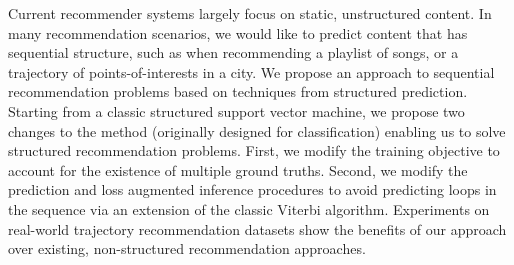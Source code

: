 
Current recommender systems largely focus on static, unstructured content.
In many recommendation scenarios, we would like to predict content that has sequential structure,
such as when recommending a playlist of songs, or a trajectory of points-of-interests in a city.
We propose an approach to sequential recommendation problems based
on techniques from structured prediction.
Starting from a classic structured support vector machine,
we propose two changes to the method (originally designed for classification)
enabling us to solve structured recommendation problems.
First, we modify the training objective to account for the existence of multiple ground truths.
Second, we modify the prediction and loss augmented inference procedures to avoid predicting loops in the sequence via an extension of the classic Viterbi algorithm.
Experiments on real-world trajectory recommendation datasets show the benefits of our approach over existing, non-structured recommendation approaches.
